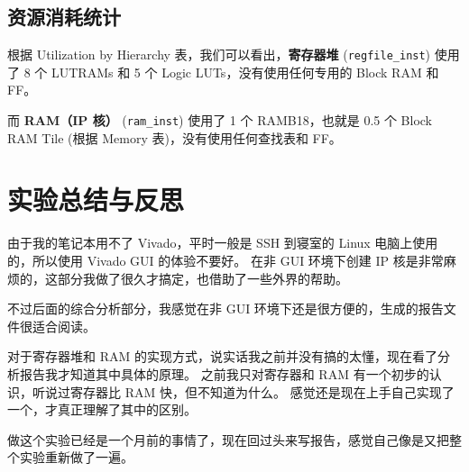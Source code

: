 \documentclass[12pt, a4paper]{ctexart}
\begin{document}
\subsection{资源消耗统计}

根据 Utilization by Hierarchy 表，我们可以看出，\textbf{寄存器堆} (\texttt{regfile\_inst}) 使用了 8 个 LUTRAMs 和 5 个 Logic LUTs，没有使用任何专用的 Block RAM 和 FF。

而 \textbf{RAM（IP 核）} (\texttt{ram\_inst}) 使用了 1 个 RAMB18，也就是 0.5 个 Block RAM Tile (根据 Memory 表)，没有使用任何查找表和 FF。

\section{实验总结与反思}

由于我的笔记本用不了 Vivado，平时一般是 SSH 到寝室的 Linux 电脑上使用的，所以使用 Vivado GUI 的体验不要好。
在非 GUI 环境下创建 IP 核是非常麻烦的，这部分我做了很久才搞定，也借助了一些外界的帮助。

不过后面的综合分析部分，我感觉在非 GUI 环境下还是很方便的，生成的报告文件很适合阅读。

对于寄存器堆和 RAM 的实现方式，说实话我之前并没有搞的太懂，现在看了分析报告我才知道其中具体的原理。
之前我只对寄存器和 RAM 有一个初步的认识，听说过寄存器比 RAM 快，但不知道为什么。
感觉还是现在上手自己实现了一个，才真正理解了其中的区别。

做这个实验已经是一个月前的事情了，现在回过头来写报告，感觉自己像是又把整个实验重新做了一遍。
\end{document}
